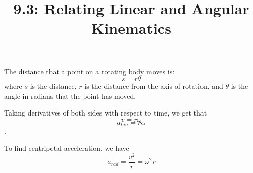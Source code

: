 \documentclass{article}
\title{9.3: Relating Linear and Angular Kinematics}
\begin{document}
\maketitle
The distance that a point on a rotating body moves is: $$s = r\theta$$where $s$ is the distance, $r$ is the distance from the axis of rotation, and $\theta$ is the angle in radians that the point has moved.

Taking derivatives of both sides with respect to time, we get that $$v = r\omega$$ $$a_{tan} = r\alpha$$.

To find centripetal acceleration, we have $$a_{rad} = \frac{v^2}{r} = \omega^2 r$$
\end{document}
